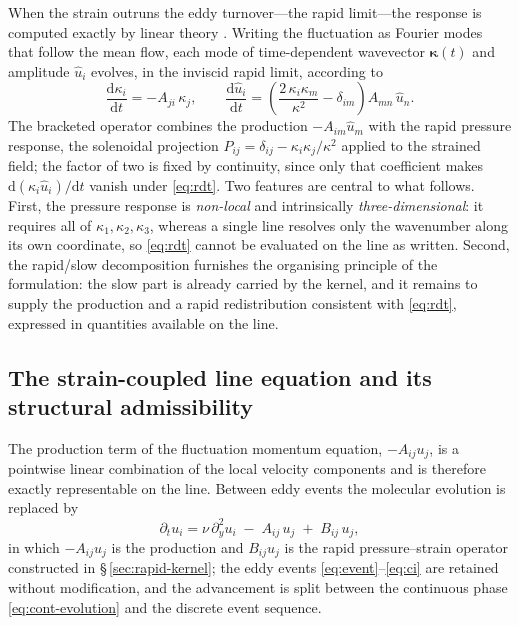 \documentclass[11pt,a4paper]{article}
\begin{document}
When the strain outruns the eddy turnover---the rapid limit---the
response is computed exactly by linear theory
\citep{BatchelorProudman1954,Hunt1973,HuntCarruthers1990}. Writing the
fluctuation as Fourier modes that follow the mean flow, each mode of
time-dependent wavevector $\boldsymbol{\kappa}(t)$ and amplitude
$\hat{u}_i$ evolves, in the inviscid rapid limit, according to
\begin{equation}
  \frac{\mathrm{d}\kappa_i}{\mathrm{d}t}=-A_{ji}\,\kappa_j,
  \qquad
  \frac{\mathrm{d}\hat{u}_i}{\mathrm{d}t}
  =\left(\frac{2\,\kappa_i \kappa_m}{\kappa^2}-\delta_{im}\right)
   A_{mn}\,\hat{u}_n .
  \label{eq:rdt}
\end{equation}
The bracketed operator combines the production $-A_{im}\hat u_m$ with the
rapid pressure response, the solenoidal projection
$P_{ij}=\delta_{ij}-\kappa_i\kappa_j/\kappa^2$ applied to the strained
field; the factor of two is fixed by continuity, since only that
coefficient makes $\mathrm{d}(\kappa_i\hat u_i)/\mathrm{d}t$ vanish under
\eqref{eq:rdt}. Two features are central to what follows. First, the
pressure response is \emph{non-local} and intrinsically
\emph{three-dimensional}: it requires all of
$\kappa_1,\kappa_2,\kappa_3$, whereas a single line resolves only the
wavenumber along its own coordinate, so \eqref{eq:rdt} cannot be
evaluated on the line as written. Second, the rapid/slow decomposition
furnishes the organising principle of the formulation: the slow part is
already carried by the kernel, and it remains to supply the production
and a rapid redistribution consistent with \eqref{eq:rdt}, expressed in
quantities available on the line.

\subsection{The strain-coupled line equation and its structural
admissibility}\label{sec:strain-forcing}

The production term of the fluctuation momentum equation, $-A_{ij}u_j$,
is a pointwise linear combination of the local velocity components and is
therefore exactly representable on the line. Between eddy events the
molecular evolution is replaced by
\begin{equation}
  \partial_t u_i
  = \nu\,\partial_y^2 u_i \;-\; A_{ij}\,u_j \;+\; B_{ij}\,u_j,
  \label{eq:cont-evolution}
\end{equation}
in which $-A_{ij}u_j$ is the production and $B_{ij}u_j$ is the rapid
pressure--strain operator constructed in \S\,\ref{sec:rapid-kernel}; the
eddy events \eqref{eq:event}--\eqref{eq:ci} are retained without
modification, and the advancement is split between the continuous phase
\eqref{eq:cont-evolution} and the discrete event sequence.
\end{document}
